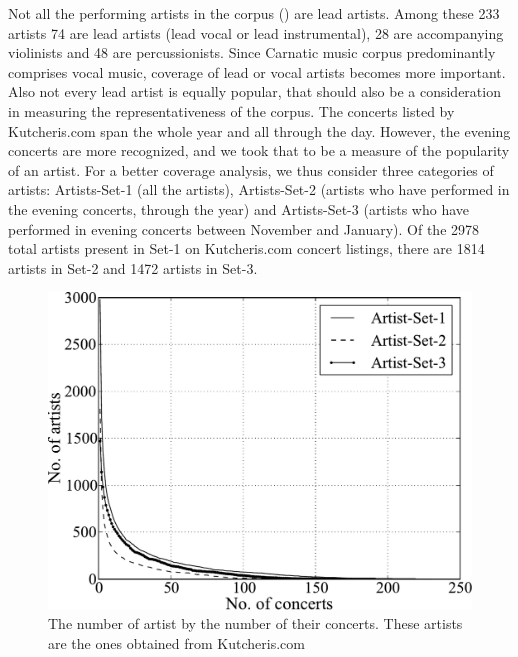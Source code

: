 Not all the performing artists in the corpus () are lead artists. Among these 233 artists 74 are lead artists (lead vocal or lead instrumental), 28 are accompanying violinists and 48 are percussionists. Since Carnatic music corpus predominantly comprises vocal music, coverage of lead or vocal artists becomes more important. Also not every lead artist is equally popular, that should also be a consideration in measuring the representativeness of the corpus. The concerts listed by Kutcheris.com span the whole year and all through the day. However, the evening concerts are more
recognized, and we took that to be a measure of the popularity of an artist. For a better coverage analysis, we thus consider three categories of artists: Artists-Set-1 (all the artists), Artists-Set-2 (artists who have performed in the evening concerts, through the year) and Artists-Set-3 (artists who
have performed in evening concerts between November and January). Of the 2978 total artists present in Set-1 on Kutcheris.com concert listings, there are 1814 artists in Set-2 and 1472 artists in Set-3.

\begin{figure}
	\begin{center}
		\includegraphics[width=\figSizeHundred]{ch04_datasets/figures/performances-vs-artists.pdf}
	\end{center}
	\caption{The number of artist by the number of their concerts. These artists are the ones obtained from Kutcheris.com}
	\label{fig:number_artrist_vs_number_concerts}
\end{figure}

